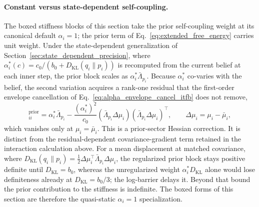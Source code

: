 \paragraph{Constant versus state-dependent self-coupling.} The boxed stiffness blocks of this section take the prior self-coupling weight at its canonical default $\alpha_i = 1$; the prior term of Eq.~\eqref{eq:extended_free_energy} carries unit weight. Under the state-dependent generalization of Section~\ref{sec:state_dependent_precision}, where $\alpha_i^*(c) = c_0/(b_0 + D_{\mathrm{KL}}(q_i \| p_i))$ is recomputed from the current belief at each inner step, the prior block scales as $\alpha_i^* \bar{\Lambda}_{p_i}$. Because $\alpha_i^*$ co-varies with the belief, the second variation acquires a rank-one residual that the first-order envelope cancellation of Eq.~\eqref{eq:alpha_envelope_cancel_itfb} does not remove,
\begin{equation}
[M_{\mu\mu}]_{ii}^{\text{prior}} = \alpha_i^* \bar{\Lambda}_{p_i} - \frac{(\alpha_i^*)^2}{c_0}\left(\bar{\Lambda}_{p_i}\Delta\mu_i\right)\left(\bar{\Lambda}_{p_i}\Delta\mu_i\right)^\top, \qquad \Delta\mu_i = \mu_i - \bar{\mu}_i,
\end{equation}
which vanishes only at $\mu_i = \bar{\mu}_i$. This is a prior-sector Hessian correction. It is distinct from the residual-dependent covariance-gradient term retained in the interaction calculation above. For a mean displacement at matched covariance, where $D_{\mathrm{KL}}(q_i \| p_i) = \tfrac{1}{2}\Delta\mu_i^\top \bar{\Lambda}_{p_i}\Delta\mu_i$, the regularized prior block stays positive definite until $D_{\mathrm{KL}} = b_0$, whereas the unregularized weight $\alpha_i^* D_{\mathrm{KL}}$ alone would lose definiteness already at $D_{\mathrm{KL}} = b_0/3$; the log-barrier delays it. Beyond that bound the prior contribution to the stiffness is indefinite. The boxed forms of this section are therefore the quasi-static $\alpha_i = 1$ specialization.

